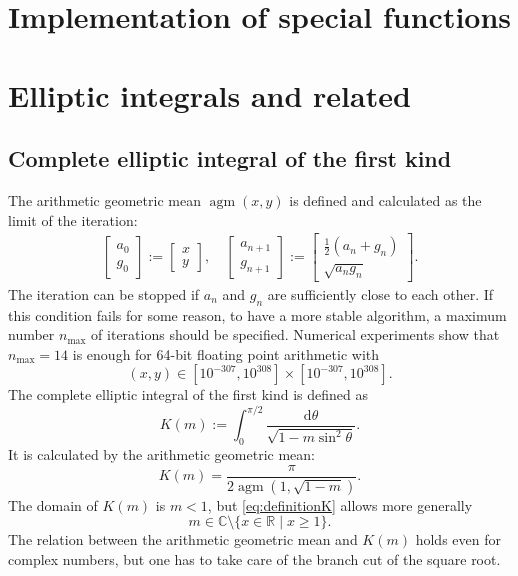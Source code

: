 \documentclass[a4paper,10pt,fleqn]{scrartcl}
\numberwithin{equation}{section}
\newcommand{\R}{\mathbb R}
\newcommand{\C}{\mathbb C}
\begin{document}
\thispagestyle{empty}

\section*{Implementation of special functions}

\tableofcontents

\section{Elliptic integrals and related}
\subsection{Complete elliptic integral of the first kind}
The arithmetic geometric mean $\operatorname{agm}(x,y)$
is defined and calculated as the limit of the iteration:
\begin{align}
\begin{bmatrix}
a_0\\
g_0
\end{bmatrix}
:=
\begin{bmatrix}
x\\
y
\end{bmatrix},
\quad
\begin{bmatrix}
a_{n+1}\\
g_{n+1}
\end{bmatrix}
:=
\begin{bmatrix}
\tfrac{1}{2}(a_n+g_n)\\
\sqrt{a_n g_n}
\end{bmatrix}.
\end{align}
The iteration can be stopped if $a_n$ and $g_n$ are sufficiently
close to each other. If this condition fails for some reason,
to have a more stable algorithm, a maximum number $n_{\mathrm{max}}$ of iterations
should be specified. Numerical experiments show that $n_{\mathrm{max}}=14$
is enough for 64-bit floating point arithmetic with
\begin{equation}
(x,y)\in [10^{-307},10^{308}]\times [10^{-307},10^{308}].
\end{equation}
The complete elliptic integral of the first kind is defined as
\begin{equation}\label{eq:definitionK}
K(m) := \int_0^{\pi/2} \frac{\mathrm d\theta}{\sqrt{1-m\sin^2\theta}}.
\end{equation}
It is calculated by the arithmetic
geometric mean:
\begin{equation}
K(m) = \frac{\pi}{2\operatorname{agm}(1,\sqrt{1-m})}.
\end{equation}
The domain of $K(m)$ is $m<1$, but \eqref{eq:definitionK} allows more generally
\begin{equation}
m\in\C\setminus\{x\in\R\mid x\ge 1\}.
\end{equation}
The relation between the arithmetic geometric mean and $K(m)$ holds
even for complex numbers, but one has to take care of the branch
cut of the square root.
\end{document}
